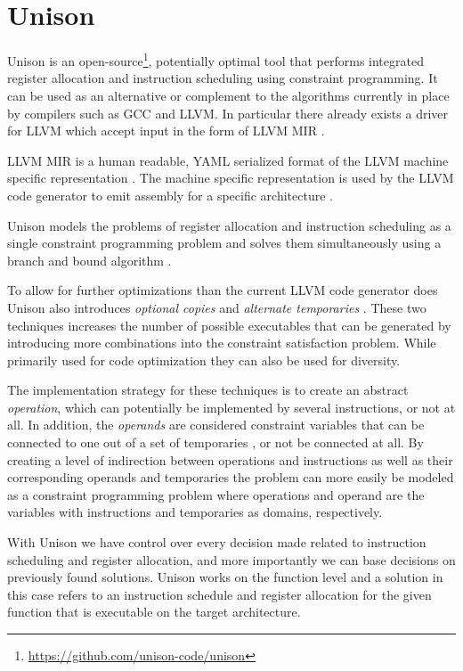 \section{Unison}
\label{sec:unison}

Unison is an open-source\footnote{\url{https://github.com/unison-code/unison}},
potentially optimal tool that performs integrated register allocation and instruction
scheduling using constraint programming. It can be used as an alternative or complement to
the algorithms currently in place by compilers such as GCC and LLVM. In particular there
already exists a driver for LLVM which accept input in the form of LLVM MIR \cite{unison-docs}.

LLVM MIR is a human readable, YAML serialized format of the LLVM machine specific
representation \cite{llvm-mir-lang-ref}. The machine specific representation is used by the
LLVM code generator to emit assembly for a specific architecture \cite{welcome-to-backend}.

Unison models the problems of register allocation and instruction scheduling as a single
constraint programming problem and solves them simultaneously using a branch and bound
algorithm \cite{unison-docs,reg-alloc-inst-sched-uni,unison-src}.

To allow for further optimizations than the current LLVM code generator does Unison also
introduces \textit{optional copies} and \textit{alternate temporaries}
\cite{reg-alloc-inst-sched-uni}. These two techniques increases the number of possible
executables that can be generated by introducing more combinations into the constraint
satisfaction problem. While primarily used for code optimization they can also be used for
diversity.

The implementation strategy for these techniques is to create an abstract \textit{operation},
which can potentially be implemented by several instructions, or not at all. In addition,
the \textit{operands} are considered constraint variables that can be connected to one out
of a set of temporaries \cite{unison-docs}, or not be connected at all. By creating a
level of indirection between operations and instructions as well as their corresponding
operands and temporaries the problem can more easily be modeled as a constraint
programming problem where operations and operand are the variables with instructions and
temporaries as domains, respectively.

With Unison we have control over every decision made related to instruction scheduling and
register allocation, and more importantly we can base decisions on previously found solutions.
Unison works on the function level and a solution in this case refers to an instruction
schedule and register allocation for the given function that is executable on the target
architecture.
